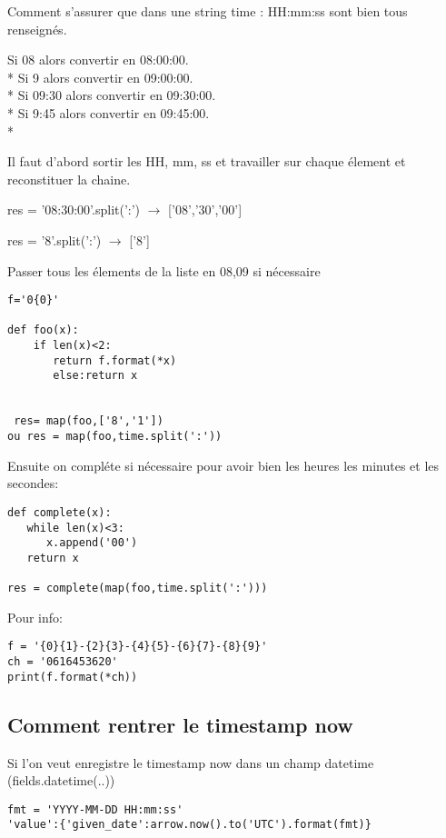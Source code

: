 \documentclass[12pt,a4paper]{article}
\begin{document}
Comment s'assurer que dans une string time : HH:mm:ss sont bien tous renseignés.

\noindent Si 08 alors convertir en 08:00:00.\\*
Si 9 alors convertir en 09:00:00.\\*
Si 09:30 alors convertir en 09:30:00.\\*
Si 9:45 alors convertir en 09:45:00.\\*

Il faut d'abord sortir les HH, mm, ss et travailler sur chaque élement et reconstituer la chaine. 

res = '08:30:00'.split(':') $\rightarrow$ ['08','30','00']


res = '8'.split(':') $\rightarrow$ ['8']

Passer tous les élements de la liste en 08,09 si nécessaire

\begin{verbatim}
f='0{0}' 

def foo(x): 
    if len(x)<2: 
       return f.format(*x) 
       else:return x
    
    
 res= map(foo,['8','1'])
ou res = map(foo,time.split(':'))
\end{verbatim}

Ensuite on compléte si nécessaire pour avoir bien les heures les minutes et les secondes:

\begin{verbatim}
def complete(x): 
   while len(x)<3: 
      x.append('00') 
   return x

res = complete(map(foo,time.split(':')))

\end{verbatim}

Pour info:
\begin{verbatim}
f = '{0}{1}-{2}{3}-{4}{5}-{6}{7}-{8}{9}' 
ch = '0616453620'
print(f.format(*ch))
\end{verbatim}

\subsection{Comment rentrer le timestamp now}
\label{sec:now}

Si l'on veut enregistre le timestamp now dans un champ datetime (fields.datetime(..))
\begin{verbatim}
fmt = 'YYYY-MM-DD HH:mm:ss'
'value':{'given_date':arrow.now().to('UTC').format(fmt)}
\end{verbatim}
\end{document}

